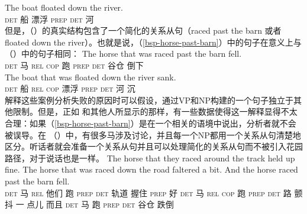 \ex 
\gll The boat floated down the river.\\
    \textsc{det} 船 漂浮 \textsc{prep} \textsc{det} 河\\
\zl
但是，（）的真实结构包含了一个简化的关系从句（raced past the barn 或者 floated down the river）。也就是说，（\ref{bsp-horse-past-barn}）中的句子在意义上与（）中的句子相同：
\eal
\ex 
\gll The horse that was raced past the barn fell.\\
    \textsc{det} 马 \textsc{rel} \textsc{cop} 跑 \textsc{prep} \textsc{det} 谷仓 倒下\\
\ex 
\gll The boat that was floated down the river sank.\\
    \textsc{det} 船 \textsc{rel} \textsc{cop} 漂浮 \textsc{prep} \textsc{det} 河 沉\\
\zl
解释这些案例分析失败的原因时可以假设，通过VP和NP构建的一个句子独立于其他限制。但是，正如 \citet{CS85a}和其他人所显示的那样，有一些数据使得这一解释显得不太合理：如果（\ref{bsp-horse-past-barn}）是在一个相关的语境中说出，分析者就不会被误导。在 （）中，有很多马涉及讨论，并且每一个NP都用一个关系从句清楚地区分。听话者就会准备一个关系从句并且可以处理简化的关系从句而不被引入花园路径，对于说话也是一样。
\ea
\gll The horse that they raced around the track held up fine. The horse that was raced down the road faltered a bit. And the horse raced past the barn fell.\\
    \textsc{det} 马 \textsc{rel} 他们 跑 \textsc{prep} \textsc{det} 轨道 握住 \textsc{prep} 好 \textsc{det} 马 \textsc{rel} \textsc{cop} 跑 \textsc{prep} \textsc{det} 路 颤抖 一 点儿 而且 \textsc{det} 马 跑 \textsc{prep} \textsc{det}  谷仓 跌倒\\
\z

